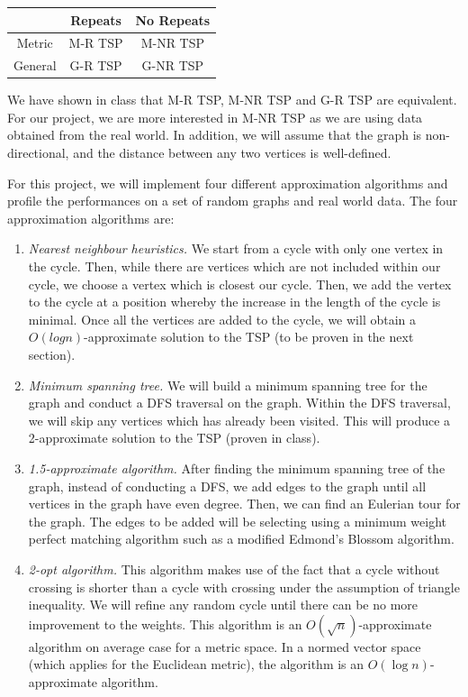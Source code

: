 \documentclass[paper=a4, fontsize=11pt]{scrartcl}	%
\numberwithin{equation}{section}		%
\numberwithin{figure}{section}			%
\numberwithin{table}{section}				%
\begin{document}
\begin{table}[h]
\centering
\begin{tabular}{|c|c|c|}
\hline
\multicolumn{1}{|l|}{} & Repeats & No Repeats \\ \hline
Metric                 & M-R TSP & M-NR TSP   \\ \hline
General                & G-R TSP & G-NR TSP   \\ \hline
\end{tabular}
\end{table}

We have shown in class that M-R TSP, M-NR TSP and G-R TSP are equivalent. For our project, we are more interested in M-NR TSP as we are using data obtained from the real world. In addition, we will assume that the graph is non-directional, and the distance between any two vertices is well-defined. 

For this project, we will implement four different approximation algorithms and profile the performances on a set of random graphs and real world data. The four approximation algorithms are:
\begin{enumerate}
\item \textit{Nearest neighbour heuristics.} We start from a cycle with only one vertex in the cycle. Then, while there are vertices which are not included within our cycle, we choose a vertex which is closest our cycle. Then, we add the vertex to the cycle at a position whereby the increase in the length of the cycle is minimal. Once all the vertices are added to the cycle, we will obtain a $O(log n)$-approximate solution to the TSP (to be proven in the next section).  
\item \textit{Minimum spanning tree.} We will build a minimum spanning tree for the graph and conduct a DFS traversal on the graph. Within the DFS traversal, we will skip any vertices which has already been visited. This will produce a 2-approximate solution to the TSP (proven in class).
\item \textit{1.5-approximate algorithm.} After finding the minimum spanning tree of the graph, instead of conducting a DFS, we add edges to the graph until all vertices in the graph have even degree. Then, we can find an Eulerian tour for the graph. The edges to be added will be selecting using a minimum weight perfect matching algorithm such as a modified Edmond's Blossom algorithm.\cite{kolmogorov}
\item \textit{2-opt algorithm.} This algorithm makes use of the fact that a cycle without crossing is shorter than a cycle with crossing under the assumption of triangle inequality. We will refine any random cycle until there can be no more improvement to the weights. This algorithm is an $O(\sqrt{n})$-approximate algorithm on average case for a metric space. \cite{christian} In a normed vector space (which applies for the Euclidean metric), the algorithm is an $O(\log n)$-approximate algorithm. 
\end{enumerate}
\end{document}
